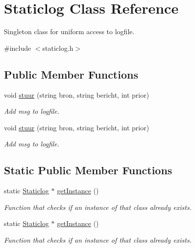 \hypertarget{class_staticlog}{\section{Staticlog Class Reference}
\label{class_staticlog}
}


Singleton class for uniform access to logfile.  




{\ttfamily \#include $<$staticlog.\-h$>$}

\subsection*{Public Member Functions}
\begin{DoxyCompactItemize}
\item 
void \hyperlink{class_staticlog_a229b8bea8e537c4fd88584f1cc0bc20a}{stuur} (string bron, string bericht, int prior)
\begin{DoxyCompactList}\small\item\em Add msg to logfile. \end{DoxyCompactList}\item 
void \hyperlink{class_staticlog_a229b8bea8e537c4fd88584f1cc0bc20a}{stuur} (string bron, string bericht, int prior)
\begin{DoxyCompactList}\small\item\em Add msg to logfile. \end{DoxyCompactList}\end{DoxyCompactItemize}
\subsection*{Static Public Member Functions}
\begin{DoxyCompactItemize}
\item 
static \hyperlink{class_staticlog}{Staticlog} $\ast$ \hyperlink{class_staticlog_a1c4bb0f55cdfc3ceb1bcf381b957a8e6}{get\-Instance} ()
\begin{DoxyCompactList}\small\item\em Function that checks if an instance of that class already exists. \end{DoxyCompactList}\item 
static \hyperlink{class_staticlog}{Staticlog} $\ast$ \hyperlink{class_staticlog_a3fb398bcfbcfdc9b1c0f8e93feebb675}{get\-Instance} ()
\begin{DoxyCompactList}\small\item\em Function that checks if an instance of that class already exists. \end{DoxyCompactList}\end{DoxyCompactItemize}


